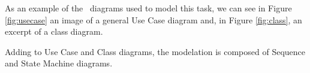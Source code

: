 As an example of the \uml\ diagrams used to model this task, we can see in Figure \ref{fig:usecase} an image of a general Use Case diagram and, in Figure \ref{fig:class}, an excerpt of a class diagram.

Adding to Use Case and Class diagrams, the modelation is composed of Sequence and State Machine diagrams.
